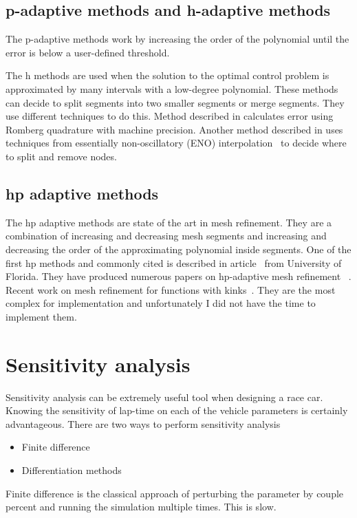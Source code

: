 \subsection{p-adaptive methods and h-adaptive methods}
The p-adaptive methods work by increasing the order of the polynomial until the error
is below a user-defined threshold.

The h methods are used when the solution to the optimal control problem is approximated by
many intervals with a low-degree polynomial. These methods can decide to split
segments into two smaller segments or merge segments. They use different techniques to do this.
Method described in \cite{betts} calculates error using Romberg quadrature with machine precision. Another
method described in \cite{jisongzhaoshuangliAdaptiveMeshRefinement} uses
techniques from essentially non-oscillatory (ENO) interpolation~\cite{Harten1997} to decide where to split and remove nodes.
\subsection{hp adaptive methods}
The hp adaptive methods are state of the art in mesh refinement. They are a
combination of increasing and decreasing mesh segments and increasing and decreasing
the order of the approximating polynomial inside segments. One of the first hp methods
and commonly cited is described in
article~\cite{darbyHpAdaptivePseudospectral2011} from University of Florida.
They have produced numerous papers on hp-adaptive mesh
refinement~\cite{agamawiCGPOPSSoftwareSolving2020}
\cite{liuAdaptiveMeshRefinement2018}. Recent work on mesh refinement for
functions with kinks~\cite{wilkaAdaptiveHpPolynomialBased2025}. They are the
most complex for implementation and unfortunately I did not have the time to
implement them.

\section{Sensitivity analysis}
\label{sec:adjoint}
Sensitivity analysis can be extremely useful tool when designing a race car. Knowing the sensitivity of lap-time on each of the vehicle parameters is certainly advantageous. There are two ways to perform sensitivity analysis
\begin{itemize}
  \item Finite difference
  \item Differentiation methods
\end{itemize}
Finite difference is the classical approach of perturbing the parameter by  couple percent and running the simulation multiple times. This is slow.


